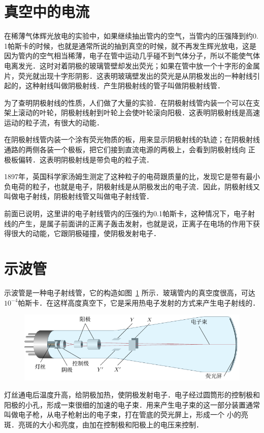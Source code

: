 \section{真空中的电流}

在稀薄气体辉光放电的实验中，如果继续抽出管内的空气，当管内的压强降到约0. 1帕斯卡的时候，也就是通常所说的抽到真空的时候，就不再发生辉光放电，这是因为管内的空气相当稀薄，电子在管中运动几乎碰不到气体分子，所以不能使气体电离发光．这时对着阴极的玻璃管壁却发出荧光；如果在管中放一个十字形的金属片，荧光就出现十字形阴影．这表明玻璃壁发出的荧光是从阴极发出的一种射线引起的，这种射线叫做阴极射线．产生阴极射线的管子叫做阴极射线管．

为了查明阴极射线的性质，人们做了大量的实验．在阴极射线管内装一个可以在支架上滚动的叶轮，阴极射线射到叶轮上会使叶轮滚向阳极．这表明阴极射线是高速运动的粒子流，有很大的动能．

在阴极射线管内装一个涂有荧光物质的板，用来显示阴极射线的轨迹；在阴极射线通路的两侧各装一个极板，把它们接到直流电源的两极上，会看到阴极射线向
正极板偏转．这表明阴极射线是带负电的粒子流．

1897年，英国科学家汤姆生测定了这种粒子的电荷跟质量的比，发现它是带有最小负电荷的粒子，也就是电子，阴极射线是从阴极发出的电子流．因此，阴极射线又叫做电子射线，阴极射线管又叫做电子射线管．

前面已说明，这里讲的电子射线管内的压强约为0.1帕斯卡，这种情况下，电子射线的产生，是属子前面讲的正离子轰击发射，也就是说，正离子在电场的作用下获得很大的动能，它跟阴极碰撞，使阴极发射电子．

\section{示波管}
示波管是一种电子射线管，它的构造如图~\ref{fig_B_8-14} 所示．玻璃管内的真空度很高，可达$10^{-4}$帕斯卡．在这样高度真空下，它是采用热电子发射的方式来产生电子射线的．
\begin{figure}[htbp]
    \centering
    \includegraphics{fig/B/8-14.pdf}
    \caption{}\label{fig_B_8-14}
\end{figure}

灯丝通电后温度升高，给阴极加热，使阴极发射电子．电子经过圆筒形的控制极和阳极的小孔，形成一束很细的加速的电子束．用来产生电子束的这一部分装置通常叫做电子枪，从电子枪射出的电子束，打在管底的荧光屏上，形成一个
小的亮斑．亮斑的大小和亮度，由加在控制极和阳极上的电压来控制．

